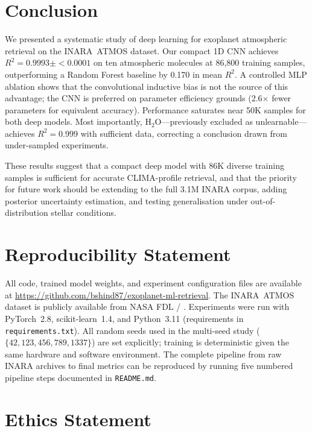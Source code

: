 \documentclass[11pt]{article}
\begin{document}
\section{Conclusion}
\label{sec:conclusion}

We presented a systematic study of deep learning for exoplanet atmospheric
retrieval on the INARA~ATMOS dataset. Our compact 1D CNN achieves $R^2 =
0.9993 \pm {<}0.0001$ on ten atmospheric molecules at 86{,}800 training samples,
outperforming a Random Forest baseline by 0.170 in mean $R^2$. A controlled
MLP ablation shows that the convolutional inductive bias is not the source of
this advantage; the CNN is preferred on parameter efficiency grounds (2.6$\times$
fewer parameters for equivalent accuracy). Performance saturates near 50K
samples for both deep models. Most importantly, H$_2$O—previously excluded as
unlearnable—achieves $R^2 = 0.999$ with sufficient data, correcting a
conclusion drawn from under-sampled experiments.

These results suggest that a compact deep model with 86K diverse training
samples is sufficient for accurate CLIMA-profile retrieval, and that the
priority for future work should be extending to the full 3.1M INARA corpus,
adding posterior uncertainty estimation, and testing generalisation under
out-of-distribution stellar conditions.


\section*{Reproducibility Statement}

All code, trained model weights, and experiment configuration files are
available at \url{https://github.com/bshind87/exoplanet-ml-retrieval}. The INARA~ATMOS
dataset is publicly available from NASA FDL / \citet{zorzan2025}. Experiments
were run with PyTorch~2.8, scikit-learn~1.4, and Python~3.11 (requirements in
\texttt{requirements.txt}). All random seeds used in the multi-seed study
($\{42, 123, 456, 789, 1337\}$) are set explicitly; training is deterministic
given the same hardware and software environment. The complete pipeline from
raw INARA archives to final metrics can be reproduced by running five numbered
pipeline steps documented in \texttt{README.md}.


\section*{Ethics Statement}
\end{document}
